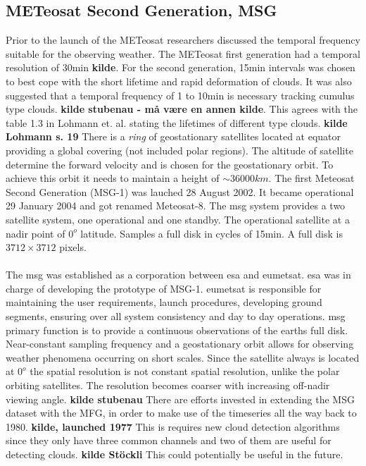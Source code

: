 \subsection{METeosat Second Generation, MSG} \label{sec:meteosat}
Prior to the launch of the METeosat researchers discussed the temporal frequency suitable for the observing weather. The METeosat first generation had a temporal resolution of 30min \textbf{kilde}. For the second generation, 15min intervals was chosen to best cope with the short lifetime and rapid deformation of clouds. It was also suggested that a temporal frequency of 1 to 10min is necessary tracking cumulus type clouds. \textbf{kilde stubenau - må være en annen kilde}. This agrees with the table 1.3 in Lohmann et. al. stating the lifetimes of different type clouds. \textbf{kilde Lohmann s. 19} There is a \textit{ring} of geostationary satellites located at equator providing a global covering (not included polar regions). The altitude of satellite determine the forward velocity and is chosen for the geostationary orbit. To achieve this orbit it needs to maintain a height of $\sim 36 000km $. The first Meteosat Second Generation (MSG-1) was lauched 28 August 2002. It became operational 29 January 2004 and got renamed Meteosat-8. The \acrshort{msg} system provides a two satellite system, one operational and one standby. The operational satellite at a nadir point of $0^o$ latitude. Samples a full disk in cycles of 15min. A full disk is $3712\times 3712$ pixels.
\\ \\ 
The \acrfull{msg} was established as a corporation between \acrfull{esa} and \acrfull{eumetsat}. \acrshort{esa} was in charge of developing the prototype of MSG-1. \acrshort{eumetsat} is responsible for maintaining the user requirements, launch procedures, developing ground segments, ensuring over all system consistency and day to day operations.  \acrshort{msg} primary function is to provide a continuous observations of the earths full disk. Near-constant sampling frequency and a geostationary orbit allows for observing weather phenomena occurring on short scales. Since the satellite always is located at $0^o$ the spatial resolution is not constant spatial resolution, unlike the polar orbiting satellites. The resolution becomes coarser with increasing off-nadir viewing angle. \textbf{kilde stubenau} There are efforts invested in extending the MSG dataset with the MFG, in order to make use of the timeseries all the way back to 1980. \textbf{kilde, launched 1977} This is requires new cloud detection algorithms since they only have three common channels and two of them are useful for detecting clouds. \textbf{kilde Stöckli} This could potentially be useful in the future. 
